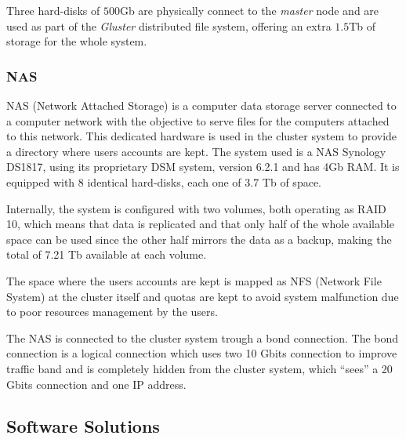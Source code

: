 \documentclass[twoside,a4paper,12pt,english]{inac19}
\begin{document}
Three hard-disks of $500$Gb are physically connect to the \textit{master} node and are used as part of the 
\textit{Gluster} distributed file system, offering
an extra $1.5$Tb of storage for the whole system.



\subsubsection{NAS}

NAS (Network Attached Storage) is a computer data storage server connected to a computer
network with the objective to serve files for the computers attached to this network. This
dedicated hardware is used in the cluster system to provide a directory where users accounts
are kept. The system used is a NAS Synology DS1817, using its proprietary DSM system, version
6.2.1 and has 4Gb RAM. It is equipped with 8 identical hard-disks, each one of 3.7 Tb of space.

Internally, the system is configured with two volumes, both operating as RAID 10,
which means that data is replicated and that only half of the whole available space
can be used since the other half mirrors the data as a backup, making the total
of 7.21 Tb available at each volume.

The space where the users accounts are kept is mapped as NFS (Network File System) at the
cluster itself and quotas are kept to avoid system malfunction due to poor resources management
by the users.

The NAS is connected to the cluster system trough a bond connection. The bond connection is a logical
connection which uses two 10 Gbits connection to improve traffic band and is completely hidden from
the cluster system, which ``sees'' a 20 Gbits connection and one IP address.




\subsection{Software Solutions}
\label{sub:ssol}
\end{document}
